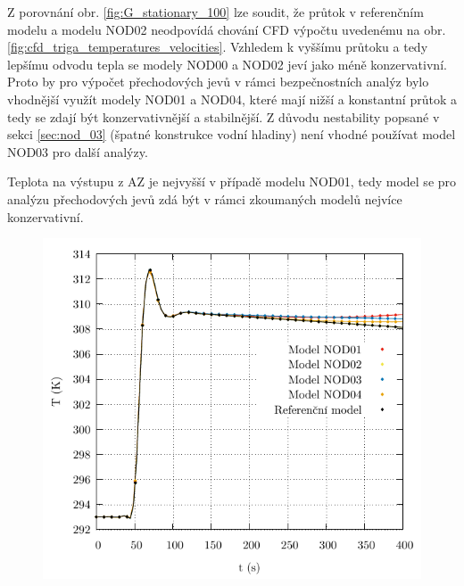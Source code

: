 Z porovnání obr. \ref{fig:G_stationary_100} lze soudit, že průtok v referenčním modelu a modelu NOD02 neodpovídá chování CFD výpočtu uvedenému na obr. \ref{fig:cfd_triga_temperatures_velocities}. Vzhledem k vyššímu průtoku a tedy lepšímu odvodu tepla se modely NOD00 a NOD02 jeví jako méně konzervativní. Proto by pro výpočet přechodových jevů v rámci bezpečnostních analýz bylo vhodnější využít modely NOD01 a NOD04, které mají nižší a konstantní průtok a tedy se zdají být konzervativnější a stabilnější. Z důvodu nestability popsané v sekci \ref{sec:nod_03} (špatné konstrukce vodní hladiny) není vhodné používat model NOD03 pro další analýzy.

Teplota na výstupu z AZ je nejvyšší v případě modelu NOD01, tedy model se pro analýzu přechodových jevů zdá být v rámci zkoumaných modelů nejvíce konzervativní.
\begin{figure}[H]
	\centering
	\begin{minipage}{.5\textwidth}
		\centering
		\includegraphics[width=\textwidth]{./06_hodnoceni_TH_modelu/grafy/T_out_stationary_100_trans.pdf}
	\end{minipage}%
	\begin{minipage}{.5\textwidth}
		\centering

\end{minipage}
\end{figure}
